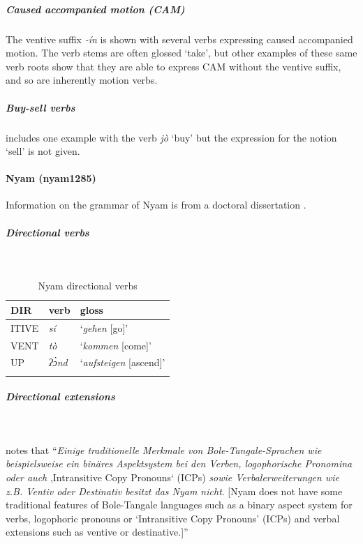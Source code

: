 \subparagraph{Caused accompanied motion (CAM)}



The ventive suffix \textit{-ín} is shown with several verbs expressing caused accompanied motion. The verb stems are often glossed `take', but other examples of these same verb roots show that they are able to express CAM without the ventive suffix, and so are inherently motion verbs. 

\subparagraph{Buy-sell verbs}



\citet[99]{baticGrammaticalSketchBure2014} includes one example with the verb \textit{jò} `buy' but the expression for the notion `sell' is not given. 

\paragraph*{Nyam (nyam1285)} \label{nyam}

Information on the grammar of Nyam is from a doctoral dissertation \citep{andreasGrammatischeBeschreibungNyam2012}. 

\subparagraph{Directional verbs}~



\begin{table}[H]
	\caption{Nyam directional verbs} 
	\label{tab:nyamV}
	\begin{tabular}{lll} %
		\lsptoprule
		DIR & verb & gloss   \\ %
		\midrule
		ITIVE & \textit{sí} & `\textit{gehen} [go]' \\
		VENT & \textit{tò} & `\textit{kommen} [come]' \\
		UP & \textit{ʔɔ̀nd} & `\textit{aufsteigen} [ascend]' \\
		\lspbottomrule
	\end{tabular}
\end{table}

\subparagraph{Directional extensions}~



\citet[212]{andreasGrammatischeBeschreibungNyam2012} notes that ``\textit{Einige traditionelle Merkmale von Bole-Tangale-Sprachen wie beispielsweise ein binäres Aspektsystem bei den Verben, logophorische Pronomina oder auch} ,Intransitive Copy Pronouns‘ (ICPs) \textit{sowie Verbalerweiterungen wie z.B. Ventiv oder Destinativ besitzt das Nyam nicht}. [Nyam does not have some traditional features of Bole-Tangale languages such as a binary aspect system for verbs, logophoric pronouns or `Intransitive Copy Pronouns' (ICPs) and verbal extensions such as ventive or destinative.]''

